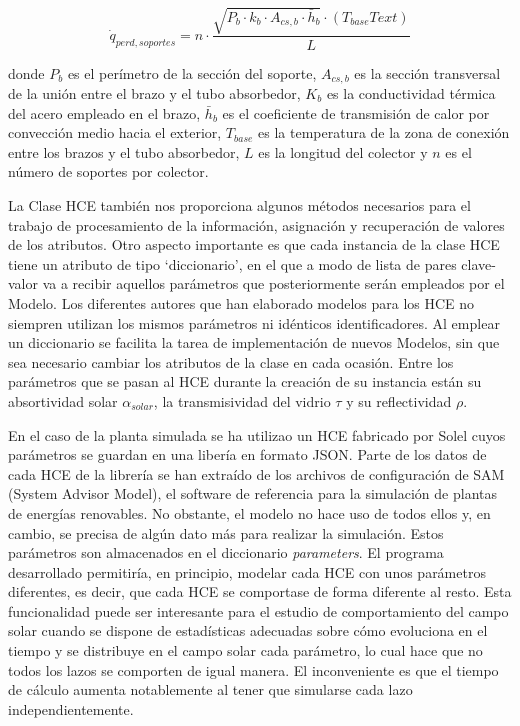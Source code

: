 \begin{equation}
   \dot q_{perd,soportes} =  n \cdot \frac{\sqrt{P_b \cdot k_b \cdot A_{cs,b} \cdot \bar h_b} \cdot (T_{base}T{ext})}{L}
    \label{eq:qperdidassoportes}
\end{equation}

donde \(P_b\) es el perímetro de la sección del soporte, \(A_{cs,b}\) es la sección transversal de la unión entre el brazo y el tubo absorbedor, \(K_b\) es la conductividad térmica del acero empleado en el brazo, \(\bar h_b\) es el coeficiente de transmisión de calor por convección medio hacia el exterior, \(T_{base}\) es la temperatura de la zona de conexión entre los brazos y el tubo absorbedor, \(L\) es la longitud del colector y \(n\) es el número de soportes por colector.

La Clase HCE también nos proporciona algunos métodos necesarios para el trabajo de procesamiento de la información, asignación y recuperación de valores de los atributos. Otro aspecto importante es que cada instancia de la clase HCE tiene un
atributo de tipo `diccionario', en el que a modo de lista de pares clave-valor va a recibir aquellos parámetros que posteriormente serán empleados por el Modelo. Los diferentes autores que han elaborado modelos para los HCE no siempren utilizan los mismos parámetros ni idénticos identificadores. Al emplear un diccionario se facilita la tarea de implementación de nuevos Modelos, sin que sea necesario cambiar los atributos de la clase en cada ocasión. Entre los parámetros que se
pasan al HCE durante la creación de su instancia están su absortividad solar \(\alpha_{solar}\), la transmisividad del vidrio \(\tau\) y su reflectividad \(\rho\).

En el caso de la planta simulada se ha utilizao un HCE fabricado por Solel cuyos parámetros se guardan en una libería en formato JSON. Parte de los datos de cada HCE de la librería se han extraído de los archivos de configuración de SAM (System Advisor Model), el software de referencia para la simulación de plantas de energías renovables. No obstante, el modelo no hace uso de todos ellos y, en cambio, se precisa de algún dato más para realizar la simulación. Estos parámetros son
almacenados en el diccionario \emph{parameters}. El programa desarrollado permitiría, en principio, modelar cada HCE con unos parámetros diferentes, es decir, que cada HCE se comportase de forma diferente al resto. Esta funcionalidad puede ser interesante para el estudio de comportamiento del campo solar cuando se dispone de estadísticas adecuadas sobre cómo evoluciona en el tiempo y se distribuye en el campo solar cada parámetro, lo cual hace que no todos los lazos se comporten de igual manera. El inconveniente es que el tiempo de cálculo aumenta notablemente al tener que simularse cada lazo independientemente. 

